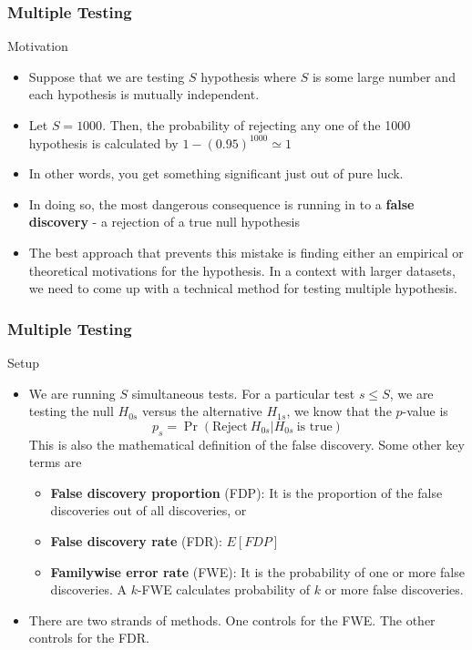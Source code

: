 \documentclass{beamer}
\begin{document}
\begin{frame}
\frametitle{Multiple Testing}
Motivation
\begin{itemize}
\item Suppose that we are testing $S$ hypothesis where $S$ is some large number and each hypothesis is mutually independent.
\item Let $S=1000$. Then, the probability of rejecting any one of the 1000 hypothesis is calculated by $1-(0.95)^{1000}\simeq1$
\item In other words, you get something significant just out of pure luck. 
\item In doing so, the most dangerous consequence is running in to a \textbf{false discovery} - a rejection of a true null hypothesis
\item The best approach that prevents this mistake is finding either an empirical or theoretical motivations for the hypothesis. In a context with larger datasets, we need to come up with a technical method for testing multiple hypothesis. 
\end{itemize}
\end{frame}

\begin{frame}
\frametitle{Multiple Testing}
Setup
\begin{itemize}
\item We are running $S$ simultaneous tests. For a particular test $s\leq S$, we are testing the null $H_{0s}$ versus the alternative $H_{1s}$, we know that the $p$-value is
\[
p_s = \Pr(\text{Reject}\ H_{0s}|H_{0s} \ \text{is true}) 
\]
This is also the mathematical definition of the false discovery. Some other key terms are
\begin{itemize}
\item \textbf{False discovery proportion} (FDP): It is the proportion of the false discoveries out of all discoveries, or
\item \textbf{False discovery rate} (FDR): $E[FDP]$
\item \textbf{Familywise error rate} (FWE): It is the probability of one or more false discoveries. A $k$-FWE calculates probability of $k$ or more false discoveries.
\end{itemize}\par
\item There are two strands of methods. One controls for the FWE. The other controls for the FDR.
\end{itemize}
\end{frame}
\end{document}
